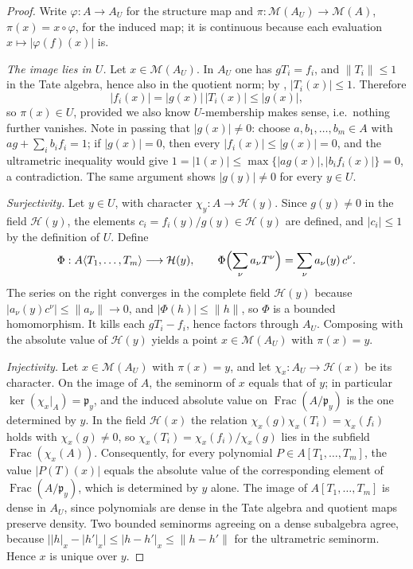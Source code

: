 \begin{proof}
Write $\varphi:A\to A_U$ for the structure map and
$\pi:\mathcal M(A_U)\to\mathcal M(A)$, $\pi(x)=x\circ\varphi$, for
the induced map; it is continuous because each evaluation
$x\mapsto|\varphi(f)(x)|$ is.

\emph{The image lies in $U$.}
Let $x\in\mathcal M(A_U)$.  In $A_U$ one has $gT_i=f_i$, and
$\|T_i\|\leq1$ in the Tate algebra, hence also in the quotient norm; by
, $|T_i(x)|\leq1$.  Therefore
\[
 |f_i(x)|=|g(x)|\,|T_i(x)|\leq|g(x)|,
\]
so $\pi(x)\in U$, provided we also know $U$-membership makes sense,
i.e.\ nothing further vanishes.  Note in passing that $|g(x)|\neq0$:
choose $a,b_1,\ldots,b_m\in A$ with $ag+\sum_ib_if_i=1$; if
$|g(x)|=0$, then every $|f_i(x)|\leq|g(x)|=0$, and the ultrametric
inequality would give $1=|1(x)|\leq\max\{|ag(x)|,|b_if_i(x)|\}=0$, a
contradiction.  The same argument shows $|g(y)|\neq0$ for every
$y\in U$.

\emph{Surjectivity.}
Let $y\in U$, with character $\chi_y:A\to\mathcal H(y)$.  Since
$g(y)\neq0$ in the field $\mathcal H(y)$, the elements
$c_i=f_i(y)/g(y)\in\mathcal H(y)$ are defined, and $|c_i|\leq1$ by the
definition of $U$.  Define
\[
 \Phi:A\langle T_1,\ldots,T_m\rangle\longrightarrow\mathcal H(y),
 \qquad
 \Phi\Bigl(\sum_\nu a_\nu T^\nu\Bigr)=\sum_\nu a_\nu(y)\,c^\nu.
\]
The series on the right converges in the complete field
$\mathcal H(y)$ because $|a_\nu(y)c^\nu|\leq\|a_\nu\|\to0$, and
$|\Phi(h)|\leq\|h\|$, so $\Phi$ is a bounded homomorphism.  It kills
each $gT_i-f_i$, hence factors through $A_U$.  Composing with the
absolute value of $\mathcal H(y)$ yields a point
$x\in\mathcal M(A_U)$ with $\pi(x)=y$.

\emph{Injectivity.}
Let $x\in\mathcal M(A_U)$ with $\pi(x)=y$, and let
$\chi_x:A_U\to\mathcal H(x)$ be its character.  On the image of $A$,
the seminorm of $x$ equals that of $y$; in particular
$\ker(\chi_x|_A)=\mathfrak p_y$, and the induced absolute value on
$\operatorname{Frac}(A/\mathfrak p_y)$ is the one determined by $y$.
In the field $\mathcal H(x)$ the relation
$\chi_x(g)\chi_x(T_i)=\chi_x(f_i)$ holds with $\chi_x(g)\neq0$, so
$\chi_x(T_i)=\chi_x(f_i)/\chi_x(g)$ lies in the subfield
$\operatorname{Frac}(\chi_x(A))$.  Consequently, for every polynomial
$P\in A[T_1,\ldots,T_m]$, the value $|P(T)(x)|$ equals the absolute
value of the corresponding element of
$\operatorname{Frac}(A/\mathfrak p_y)$, which is determined by $y$
alone.  The image of $A[T_1,\ldots,T_m]$ is dense in $A_U$, since
polynomials are dense in the Tate algebra and quotient maps preserve
density.  Two bounded seminorms agreeing on a dense subalgebra agree,
because
$\bigl||h|_x-|h'|_x\bigr|\leq|h-h'|_x\leq\|h-h'\|$ for the ultrametric
seminorm.  Hence $x$ is unique over $y$.


\end{proof}
